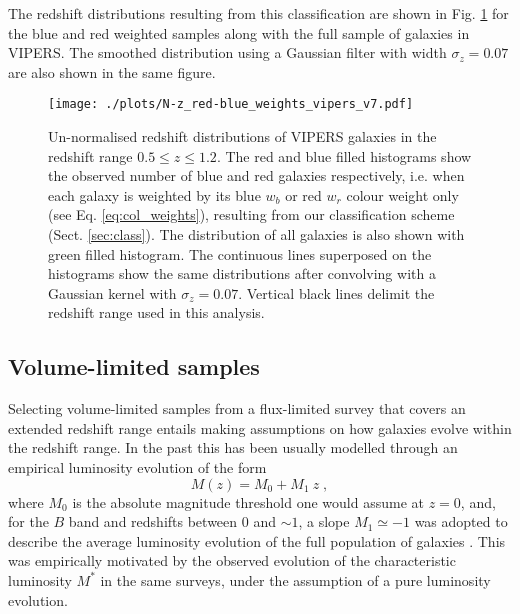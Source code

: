 \documentclass[longauth]{aa}
\def\({\left(}
\def\){\right)}
\begin{document}
The redshift distributions resulting from this classification are shown in Fig. \ref{fig:n-z_data} for the blue and red weighted samples along with the full sample of galaxies in VIPERS. The smoothed distribution using a Gaussian filter with width $\sigma_z=0.07$ are also shown in the same figure.
	\begin{figure}
    \centering
		\texttt{[image: ./plots/N-z\_red-blue\_weights\_vipers\_v7.pdf]}
		\caption{Un-normalised redshift distributions of VIPERS galaxies in the redshift range $0.5\le z\le 1.2$. The red and blue filled histograms show the observed number of blue and red galaxies respectively, i.e. when each galaxy is weighted by its blue $w_b$ or red $w_r$ colour weight only (see Eq. \ref{eq:col_weights}), resulting from our classification scheme (Sect. \ref{sec:class}). The distribution of all galaxies is also shown with green filled histogram. The continuous lines superposed on the histograms show the same distributions after convolving with a Gaussian kernel with $\sigma_z=0.07$. Vertical black  lines delimit the redshift range used in this analysis.}\label{fig:n-z_data}
	\end{figure}
\subsection{Volume-limited samples}	\label{sec:vol-lim_data}


Selecting volume-limited samples from a flux-limited survey that covers an extended redshift range  entails making assumptions on how galaxies evolve within the redshift range. In the past this has been usually modelled through an empirical  luminosity evolution of the form
%
	\begin{equation}
		M\(z\) =  M_0 + M_1~z \; ,						\label{eq:lum-evol}
	\end{equation}
%
where $M_0$ is the absolute magnitude threshold one would assume at $z=0$, and, for the $B$ band and redshifts between 0 and $\sim 1$, a slope $M_1 \simeq -1$ was adopted to describe the average luminosity evolution of the full population of galaxies \citep[e.g. zCOSMOS:][]{lilly09}. This was empirically motivated by  the observed evolution of the characteristic luminosity $M^*$ in the same surveys, under the assumption of a pure luminosity evolution.  
\end{document}
